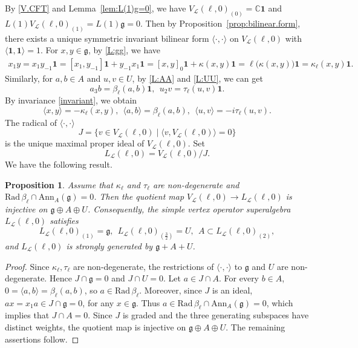 \documentclass[12pt]{article}
\numberwithin{equation}{section}
\newtheorem{proposition}[theorem]{Proposition}
\theoremstyle{definition}
\theoremstyle{plain}
\newcommand{\bC}{\ensuremath{\mathbb{C}}}
\newcommand{\Rad}{\mathrm{Rad }}
\newcommand{\Ann}{\mathrm{Ann }}
\newcommand{\fg}{\mathfrak{g}}
\newcommand{\cL}{\ensuremath{\mathcal{L}}}
\newcommand{\bone}{\mathbf{1 }}
\begin{document}
By \eqref{V.CFT} and Lemma~\ref{lem:L(1)g=0}, we have $V_\cL(\ell,0)_{(0)}=\bC\bone$ and $L(1)V_\cL(\ell,0)_{(1)}=L(1)\fg=0$. Then by Proposition~\ref{prop:bilinear.form}, there exists a unique symmetric invariant bilinear form $\langle\cdot,\cdot\rangle$ on $V_\cL(\ell,0)$ with $\langle\bone,\bone\rangle=1$. For $x,y\in\fg$, by \eqref{L:gg}, we have
\begin{align*}
    x_1y=x_1y_{-1}\bone=[x_1,y_{-1}]\bone+y_{-1}x_1\bone=[x,y]_0\bone+\kappa(x,y)\bone=\ell\big(\kappa(x,y)\big)\bone=\kappa_\ell(x,y)\bone.
\end{align*}
Similarly, for $a,b\in A$ and $u,v\in U$, by \eqref{L:AA} and \eqref{L:UU}, we can get
\begin{equation*}
    a_3b=\beta_\ell(a,b)\bone,\ \ u_2v=\tau_\ell(u,v)\bone.
\end{equation*}
By invariance \eqref{invariant}, we obtain
\begin{equation*}
    \langle x,y\rangle=-\kappa_\ell(x,y),\ \ \langle a,b\rangle=\beta_\ell(a,b),\ \ \langle u,v\rangle=-i\tau_\ell(u,v).
\end{equation*}
The radical of $\langle\cdot,\cdot\rangle$
\begin{equation*}
    J=\{v\in V_{\cL}(\ell,0)\mid \langle v,V_{\cL}(\ell,0)\rangle=0\}
\end{equation*}
is the unique maximal proper ideal of $V_{\cL}(\ell,0)$. Set
\begin{equation*}
    L_{\cL}(\ell,0)=V_{\cL}(\ell,0)/J.
\end{equation*}
We have the following result.
\begin{proposition}\label{prop:simple<-}
    Assume that $\kappa_\ell$ and $\tau_\ell$ are non-degenerate and $\Rad\,\beta_\ell\cap\Ann_A(\fg)=0$. Then the quotient map $V_\cL(\ell,0)\to L_\cL(\ell,0)$ is injective on $\fg\oplus A\oplus U$. Consequently, the simple vertex operator superalgebra $L_\cL(\ell,0)$ satisfies 
    \begin{equation*}
        L_\cL(\ell,0)_{(1)}=\mathfrak g,\ \ L_\cL(\ell,0)_{(\frac32)}=U,\ \ A\subset L_\cL(\ell,0)_{(2)},
    \end{equation*}
    and $L_\cL(\ell,0)$ is strongly generated by $\fg+A+U$.
\end{proposition}
\begin{proof}
    Since $\kappa_\ell,\tau_\ell$ are non-degenerate, the restrictions of $\langle\cdot,\cdot\rangle$ to $\fg$ and $U$ are non-degenerate. Hence $J\cap \fg=0$ and $J\cap U=0$. Let $a\in J\cap A$. For every $b\in A$, $0=\langle a,b\rangle=\beta_\ell(a,b)$, so $a\in\Rad\,\beta_\ell$. Moreover, since $J$ is an ideal, $ax=x_1a\in J\cap\mathfrak g=0$, for any $x\in\fg$. Thus $a\in \Rad\,\beta_\ell\cap \Ann_A(\fg)=0$, which implies that $J\cap A=0$.  Since $J$ is graded and the three generating subspaces have distinct weights, the quotient map is injective on $\fg\oplus A\oplus U$. The remaining assertions follow.
\end{proof}
\end{document}
